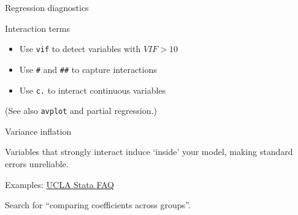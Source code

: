 \documentclass[t]{beamer}
\begin{document}
	\begin{frame}[t]{Regression diagnostics}

		\begin{block}{Interaction terms}

			\begin{itemize}
				\item Use \texttt{vif} to detect variables with $VIF > 10$
				\item Use \texttt{\#} and \texttt{\#\#} to capture interactions
				\item Use \texttt{c.} to interact continuous variables
			\end{itemize}
			
			(See also \texttt{avplot} and partial regression.)
		\end{block}

		\begin{alertblock}{Variance inflation}

			Variables that strongly interact induce  `inside' your model, making standard errors unreliable.

		\end{alertblock}

		\begin{exampleblock}{Examples: \href{http://www.ats.ucla.edu/stat/stata/faq/}{UCLA Stata FAQ}}

			Search for ``comparing coefficients across groups''.

		\end{exampleblock}
					
	\end{frame}

\end{document}
